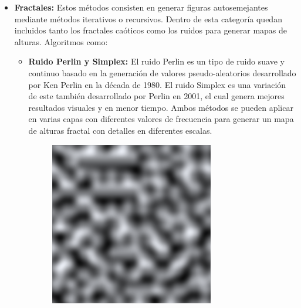             \begin{itemize}
            \item \textbf{Fractales:}
            Estos métodos consisten en generar figuras autosemejantes mediante métodos iterativos o recursivos. Dentro de esta categoría quedan incluidos tanto los fractales caóticos como los ruidos para generar mapas de alturas. Algoritmos como:
                \begin{itemize}
                    \item \textbf{Ruido Perlin y Simplex:} El ruido Perlin es un tipo de ruido suave y continuo basado en la generación de valores pseudo-aleatorios desarrollado por Ken Perlin en la década de 1980. El ruido Simplex es una variación de este también desarrollado por Perlin en 2001, el cual genera mejores resultados visuales y en menor tiempo. Ambos métodos se pueden aplicar en varias capas con diferentes valores de frecuencia para generar un mapa de alturas fractal con detalles en diferentes escalas. \cite{PerlinNoise}
                    \begin{figure}[t]
                        \centering
                        \begin{minipage}[t]{0.7\textwidth}
                            \centering
                            \begin{minipage}[t]{0.45\linewidth}
                                \centering
                                \includegraphics[width=\linewidth]{img/perlin-simple.png}

\end{minipage}
\end{minipage}
\end{figure}
\end{itemize}
\end{itemize}
